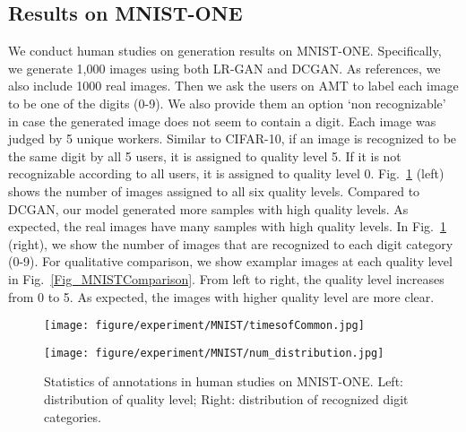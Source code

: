 \documentclass{article} \usepackage{iclr2017_conference,times}
\begin{document}
\subsection{Results on MNIST-ONE}

\label{Appendix_MNIST-ONE}


We conduct human studies on generation results on MNIST-ONE. Specifically, we generate 1,000 images using both LR-GAN and DCGAN. As references, we also include 1000 real images. Then we ask the users on AMT to label each image to be one of the digits (0-9). We also provide them an option `non recognizable' in case the generated image does not seem to contain a digit. Each image was judged by 5 unique workers. Similar to CIFAR-10, if an image is recognized to be the same digit by all 5 users, it is assigned to quality level 5. If it is not recognizable according to all users, it is assigned to quality level 0. Fig.~\ref{Fig_MNISTONE_Stat} (left) shows the number of images assigned to all six quality levels. Compared to DCGAN, our model generated more samples with high quality levels. As expected, the real images have many samples with high quality levels. In Fig.~\ref{Fig_MNISTONE_Stat} (right), we show the number of images that are recognized to each digit category (0-9). For qualitative comparison, we show examplar images at each quality level in Fig.~\ref{Fig_MNISTComparison}. From left to right, the quality level increases from 0 to 5. As expected, the images with higher quality level are more clear.
\begin{figure}[b]
\begin{minipage}{0.5\linewidth}
\center
\texttt{[image: figure/experiment/MNIST/timesofCommon.jpg]}
\end{minipage}
\begin{minipage}{0.5\linewidth}
\center
\texttt{[image: figure/experiment/MNIST/num\_distribution.jpg]}
\end{minipage}
\caption{Statistics of annotations in human studies on MNIST-ONE. Left: distribution of quality level; Right: distribution of recognized digit categories.}
\label{Fig_MNISTONE_Stat}
\end{figure}
\end{document}
